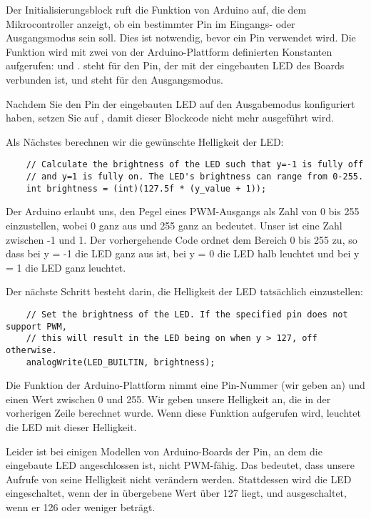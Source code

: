 Der Initialisierungsblock ruft die Funktion  von Arduino auf, die dem Mikrocontroller anzeigt, ob ein bestimmter Pin im Eingangs- oder Ausgangsmodus sein soll. Dies ist notwendig, bevor ein Pin verwendet wird. Die Funktion wird mit zwei von der Arduino-Plattform definierten Konstanten aufgerufen:   und .   steht für den Pin, der mit der eingebauten LED des Boards verbunden ist, und  steht für den Ausgangsmodus.
     
Nachdem Sie den Pin der eingebauten LED auf den Ausgabemodus konfiguriert haben, setzen Sie  auf , damit dieser Blockcode nicht mehr ausgeführt wird.

Als Nächstes berechnen wir die gewünschte Helligkeit der LED:
     
     
\begin{lstlisting}
    // Calculate the brightness of the LED such that y=-1 is fully off
 	// and y=1 is fully on. The LED's brightness can range from 0-255.
 	int brightness = (int)(127.5f * (y_value + 1));
\end{lstlisting} 

Der Arduino erlaubt uns, den Pegel eines PWM-Ausgangs als Zahl von 0 bis 255 einzustellen, wobei 0 ganz aus und 255 ganz an bedeutet. Unser  ist eine Zahl zwischen -1 und 1. Der vorhergehende Code ordnet  dem Bereich 0 bis 255 zu, so dass bei y = -1 die LED ganz aus ist, bei y = 0 die LED halb leuchtet und bei y = 1 die LED ganz leuchtet.

Der nächste Schritt besteht darin, die Helligkeit der LED tatsächlich einzustellen:

\begin{lstlisting}
    // Set the brightness of the LED. If the specified pin does not support PWM,
 	// this will result in the LED being on when y > 127, off otherwise.
 	analogWrite(LED_BUILTIN, brightness);
\end{lstlisting} 

Die Funktion  der Arduino-Plattform nimmt eine Pin-Nummer (wir geben  an) und einen Wert zwischen 0 und 255. Wir geben unsere Helligkeit an, die in der vorherigen Zeile berechnet wurde. Wenn diese Funktion aufgerufen wird, leuchtet die LED mit dieser Helligkeit.


Leider ist bei einigen Modellen von Arduino-Boards der Pin, an dem die eingebaute LED angeschlossen ist, nicht PWM-fähig. Das bedeutet, dass unsere Aufrufe von  seine Helligkeit nicht verändern werden. Stattdessen wird die LED eingeschaltet, wenn der in  übergebene Wert über 127 liegt, und ausgeschaltet, wenn er 126 oder weniger beträgt.
     
